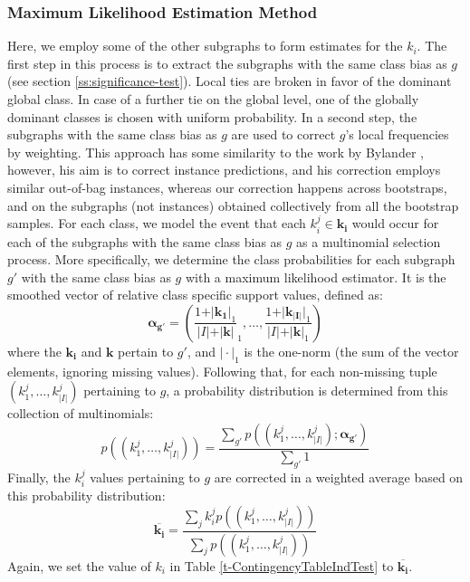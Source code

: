 \documentclass{sig-alternate}
\begin{document}
\subsubsection{Maximum Likelihood Estimation Method}
\label{ss:MLE}
Here, we employ some of the other subgraphs to form estimates for the $k_i$.
The first step in this process is to extract the subgraphs with the same class
bias as $g$ (see section \ref{ss:significance-test}). Local ties are broken in
favor of the dominant global class. In case of a further tie on the global
level, one of the globally dominant classes is chosen with uniform probability.
In a second step, the subgraphs with the same class bias as $g$ are used to correct
$g$'s local frequencies by weighting. This approach has some similarity to the
work by Bylander \cite{bylander02estimating}, however, his aim is to correct
instance predictions, and his correction employs similar out-of-bag instances,
whereas our correction happens across bootstraps, and on the subgraphs (not
instances) obtained collectively from all the bootstrap samples. For each
class, we model the event that each $k_i^j \in \mathbf{k_i}$ would occur for
each of the subgraphs with the same class bias as $g$ as a multinomial
selection process. More specifically, we determine the class probabilities for
each subgraph $g'$ with the same class bias as $g$ with a maximum likelihood
estimator. It is the smoothed vector of relative class specific support values,
defined as:
\begin{equation}
  \mathbf{\alpha_{g'}} = \left(\frac{1+\vert\mathbf{k_1}\vert_1}{\vert I\vert+\vert\mathbf{k}\vert}_1,\ldots,\frac{1+\vert\mathbf{k_{\vert I\vert}}\vert_1}{\vert I\vert+\vert\mathbf{k}\vert_1}\right)
  \label{eqn:mlexpr}
\end{equation}
where the $\mathbf{k_i}$ and $\mathbf{k}$ pertain to $g'$, and $\vert\cdot\vert_1$ is the one-norm (the sum of the vector elements, ignoring missing values). Following that, for
each non-missing tuple $(k_1^j,\ldots,k_{\vert I\vert}^j)$ pertaining to $g$, a probability distribution is
determined from this collection of multinomials:
\begin{equation}
  p((k_1^j,\ldots,k_{\vert I\vert}^j))=\frac{\sum_{g'} p((k_1^j,\ldots,k_{\vert I\vert}^j); \mathbf{\alpha_{g'}})}{\sum_{g'}1}
  \label{eqn:avgpr}
\end{equation}
Finally, the $k_i^j$ values pertaining to $g$ are corrected in a weighted average
based on this probability distribution:
\begin{equation}
  \overline{\mathbf{k_i}}=\frac{\sum_j k_i^j p((k_1^j,\ldots,k_{\vert I\vert}^j))}{\sum_j p((k_1^j,\ldots,k_{\vert I\vert}^j))}
  \label{eqn:avgki}
\end{equation}
Again, we set the value of $k_i$ in Table \ref{t-ContingencyTableIndTest} to $\overline{\mathbf{k_i}}$.
\end{document}
